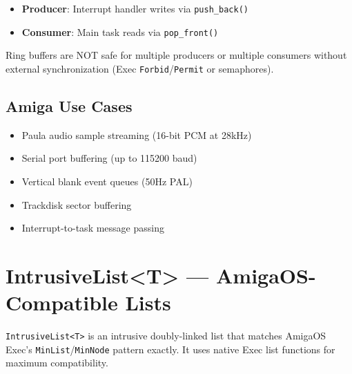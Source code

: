 \begin{itemize}
    \item \textbf{Producer}: Interrupt handler writes via \texttt{push\_back()}
    \item \textbf{Consumer}: Main task reads via \texttt{pop\_front()}
\end{itemize}

\begin{warningbox}
Ring buffers are NOT safe for multiple producers or multiple consumers without external synchronization (Exec \texttt{Forbid}/\texttt{Permit} or semaphores).
\end{warningbox}

\subsection{Amiga Use Cases}

\begin{itemize}
    \item Paula audio sample streaming (16-bit PCM at 28kHz)
    \item Serial port buffering (up to 115200 baud)
    \item Vertical blank event queues (50Hz PAL)
    \item Trackdisk sector buffering
    \item Interrupt-to-task message passing
\end{itemize}

\section{IntrusiveList<T> --- AmigaOS-Compatible Lists}
\label{sec:intrusivelist}

\texttt{IntrusiveList<T>} is an intrusive doubly-linked list that matches AmigaOS Exec's \texttt{MinList}/\texttt{MinNode} pattern exactly. It uses native Exec list functions for maximum compatibility.

